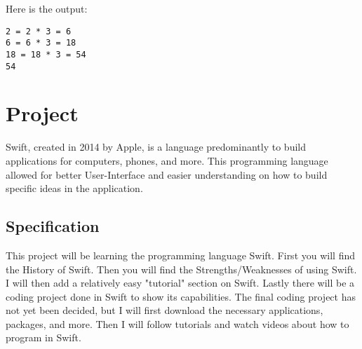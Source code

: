 \documentclass{article}
\theoremstyle{theorem}
\theoremstyle{definition}
\theoremstyle{remark}
\begin{document}
Here is the output:
\begin{verbatim}
2 = 2 * 3 = 6
6 = 6 * 3 = 18
18 = 18 * 3 = 54
54
\end{verbatim}
 
\section{Project}

Swift, created in 2014 by Apple, is a language predominantly to build applications for computers, phones, and more. This programming language allowed for better User-Interface and easier understanding on how to build specific ideas in the application. 
\subsection{Specification}
This project will be learning the programming language Swift. First you will find the History of Swift. Then you will find the Strengths/Weaknesses of using Swift. I will then add a relatively easy "tutorial" section on Swift. Lastly there will be a coding project done in Swift to show its capabilities. The final coding project has not yet been decided, but I will first download the necessary applications, packages, and more. Then I will follow tutorials and watch videos about how to program in Swift.
\end{document}
